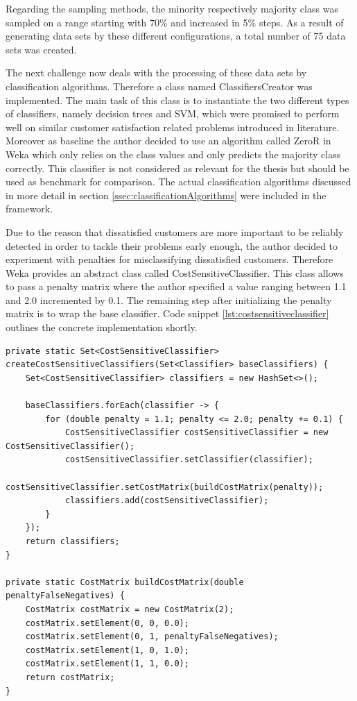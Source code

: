 Regarding the sampling methods, the minority respectively majority class was sampled on a range starting with 70\% and increased in 5\% steps. As a result of generating data sets by these different configurations, a total number of 75 data sets was created. 

The next challenge now deals with the processing of these data sets by classification algorithms. Therefore a class named ClassifiersCreator was implemented. The main task of this class is to instantiate the two different types of classifiers, namely decision trees and SVM, which were promised to perform well on similar customer satisfaction related problems introduced in literature. Moreover as baseline the author decided to use an algorithm called ZeroR in Weka which only relies on the class values and only predicts the majority class correctly. This classifier is not considered as relevant for the thesis but should be used as benchmark for comparison. The actual classification algorithms discussed in more detail in section \ref{ssec:classificationAlgorithms} were included in the framework. 

Due to the reason that dissatisfied customers are more important to be reliably detected in order to tackle their problems early enough, the author decided to experiment with penalties for misclassifying dissatisfied customers. Therefore Weka provides an abstract class called CostSensitiveClassifier. This class allows to pass a penalty matrix where the author specified a value ranging between 1.1 and 2.0 incremented by 0.1. The remaining step after initializing the penalty matrix is to wrap the base classifier. Code snippet \ref{lst:costsensitiveclassifier} outlines the concrete implementation shortly. 

\begin{lstlisting}[caption={Cost sensitive classifier}, label={lst:costsensitiveclassifier}]
private static Set<CostSensitiveClassifier> createCostSensitiveClassifiers(Set<Classifier> baseClassifiers) {
	Set<CostSensitiveClassifier> classifiers = new HashSet<>();
	
	baseClassifiers.forEach(classifier -> {
		for (double penalty = 1.1; penalty <= 2.0; penalty += 0.1) {
			CostSensitiveClassifier costSensitiveClassifier = new CostSensitiveClassifier();
			costSensitiveClassifier.setClassifier(classifier);
			costSensitiveClassifier.setCostMatrix(buildCostMatrix(penalty));
			classifiers.add(costSensitiveClassifier);
		}
	});
	return classifiers;
}

private static CostMatrix buildCostMatrix(double penaltyFalseNegatives) {
	CostMatrix costMatrix = new CostMatrix(2);
	costMatrix.setElement(0, 0, 0.0);
	costMatrix.setElement(0, 1, penaltyFalseNegatives);
	costMatrix.setElement(1, 0, 1.0);
	costMatrix.setElement(1, 1, 0.0);
	return costMatrix;
}
\end{lstlisting}

